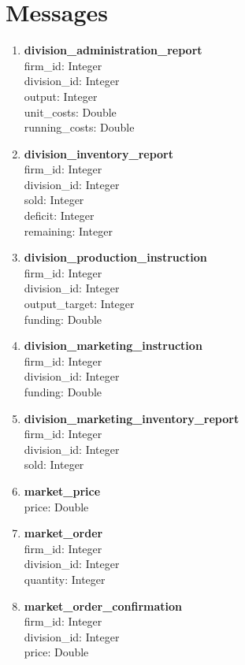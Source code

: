 \documentclass[11pt]{article}
\begin{document}
\section{Messages}
\begin{enumerate}
	\item \textbf{division\_administration\_report} \\
	firm\_id: Integer \\
	division\_id: Integer \\
	output: Integer \\
	unit\_costs: Double \\
	running\_costs: Double
	\item \textbf{division\_inventory\_report} \\
	firm\_id: Integer \\
	division\_id: Integer \\
	sold: Integer \\
	deficit: Integer \\
	remaining: Integer
	\item \textbf{division\_production\_instruction} \\
	firm\_id: Integer \\
	division\_id: Integer \\
	output\_target: Integer \\
	funding: Double
	\item \textbf{division\_marketing\_instruction} \\
	firm\_id: Integer \\
	division\_id: Integer \\
	funding: Double
	\item \textbf{division\_marketing\_inventory\_report} \\
	firm\_id: Integer \\
	division\_id: Integer \\
	sold: Integer
	\item \textbf{market\_price} \\
	price: Double
	\item \textbf{market\_order} \\
	firm\_id: Integer \\
	division\_id: Integer \\
	quantity: Integer
	\item \textbf{market\_order\_confirmation} \\
	firm\_id: Integer \\
	division\_id: Integer \\
	price: Double \\

\end{enumerate}
\end{document}
